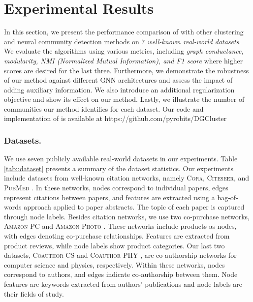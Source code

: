 \section{Experimental Results}
\label{sec::experiments}

    



In this section, we present the performance comparison of {\model} with other clustering and neural community detection methods on \textit{$7$ well-known real-world datasets}. We evaluate the algorithms using various metrics, including \textit{graph conductance, modularity, NMI (Normalized Mutual Information), and F1 score} where higher scores are desired for the last three. Furthermore, we demonstrate the robustness of our method against different GNN architectures and assess the impact of adding auxiliary information. We also introduce an additional regularization objective and show its effect on our method. Lastly, we illustrate the number of communities our method identifies for each dataset. Our code and implementation of {\model} is available at https://github.com/pyrobits/DGCluster

\subsubsection{Datasets.}

We use seven publicly available real-world datasets in our experiments. Table \ref{tab::dataset} presents a summary of the dataset statistics. Our experiments include datasets from well-known citation networks, namely \textsc{Cora}, \textsc{Citeseer}, and \textsc{PubMed} \cite{sen2008collective}. In these networks, nodes correspond to individual papers, edges represent citations between papers, and features are extracted using a bag-of-words approach applied to paper abstracts. The topic of each paper is captured through node labels. Besides citation networks, we use two co-purchase networks, \textsc{Amazon PC} and \textsc{Amazon Photo} \cite{shchur2018pitfalls}. These networks include products as nodes, with edges denoting co-purchase relationships. Features are extracted from product reviews, while node labels show product categories. Our last two datasets, \textsc{Coauthor CS} and \textsc{Coauthor PHY} \cite{shchur2018pitfalls, shchur2019overlapping}, are co-authorship networks for computer science and physics, respectively. Within these networks, nodes correspond to authors, and edges indicate co-authorship between them. Node features are keywords extracted from authors' publications and node labels are their fields of study.

